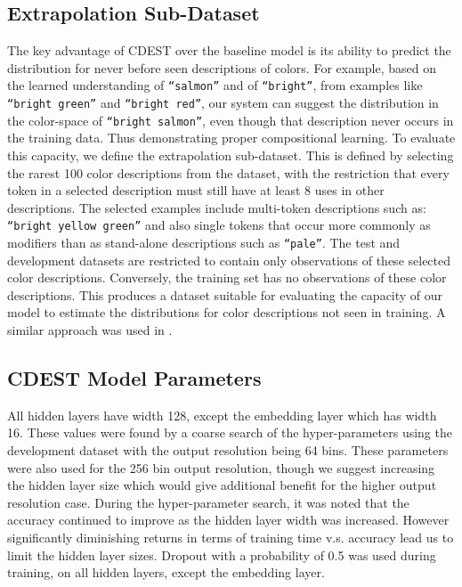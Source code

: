 \documentclass[11pt,a4paper]{article}
\newcommand{\parencite}{\citep}
\newcommand{\textcite}{\cite}
\begin{document}
\subsection{Extrapolation Sub-Dataset} \label{sec:extrapodataset}
The key advantage of CDEST over the baseline model is its ability to predict the distribution for never before seen descriptions of colors.
For example, based on the learned understanding of \texttt{``salmon''} and of \texttt{``bright''}, from examples like \texttt{``bright green''} and \texttt{``bright red''}, our system can suggest the distribution in the color-space of \texttt{``bright salmon''}, even though that description never occurs in the training data.
Thus demonstrating proper compositional learning.
%
To evaluate this capacity, we define the extrapolation sub-dataset.
This is defined by selecting the rarest 100 color descriptions from the dataset,
with the restriction that every token in a selected description must still have at least 8 uses in other descriptions.
The selected examples include multi-token descriptions such as: \texttt{``bright yellow green''} and also single tokens that occur more commonly as modifiers than as stand-alone descriptions such as \texttt{``pale''}.
The test and development datasets are restricted to contain only observations of these selected color descriptions.
Conversely, the training set has no observations of these color descriptions.
This produces a dataset suitable for evaluating the capacity of our model to estimate the distributions for color descriptions not seen in training.
A similar approach was used in \textcite{DBLP:journals/corr/AtzmonBKGC16}.

\subsection{CDEST Model Parameters}
All hidden layers have width 128, except the embedding layer which has width 16.
These values were found by a coarse search of the hyper-parameters using the development dataset with the output resolution being 64 bins.
These parameters were also used for the 256 bin output resolution, though we suggest increasing the hidden layer size which would give additional benefit for the higher output resolution case.
During the hyper-parameter search, it was noted that the accuracy continued to improve as the hidden layer width was increased.
However significantly diminishing returns in terms of training time v.s. accuracy lead us to limit the hidden layer sizes.
Dropout \parencite{srivastava2014dropout} with a probability of 0.5 was used during training, on all hidden layers, except the embedding layer.
\end{document}

